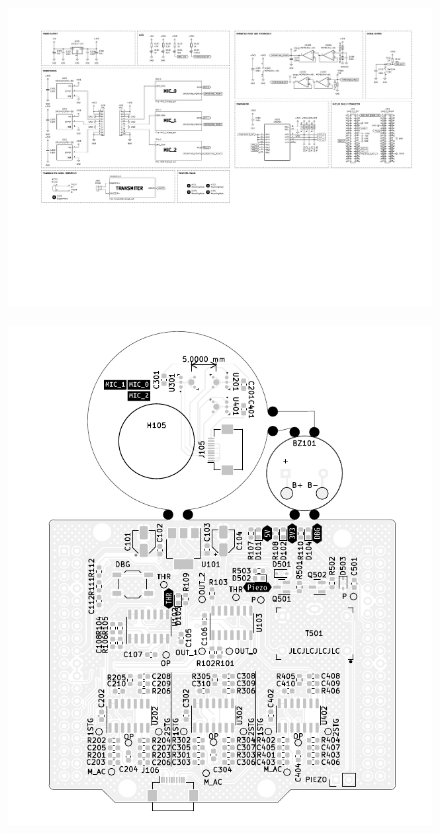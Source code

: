\begin{figure}
    \includegraphics[page = 5, width = \textwidth, trim=2cm 8cm 2cm 4cm, clip]{./figures/chapter_09/schemat_plytki.pdf}
\end{figure}

\begin{figure}
    \includegraphics[width = \textwidth]{./figures/chapter_09/board_render.png}
\end{figure}